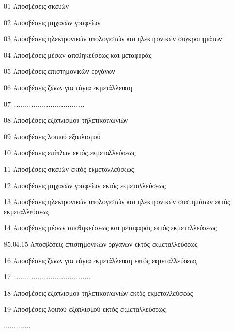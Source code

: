 \documentclass[A4,10pt,greek]{book}
\begin{document}
                               01    Αποσβέσεις σκευών

                               02    Αποσβέσεις μηχανών γραφείων

                               03    Αποσβέσεις ηλεκτρονικών υπολογιστών και ηλεκτρονικών
                                       συγκροτημάτων

                               04    Αποσβέσεις μέσων αποθηκεύσεως και μεταφοράς

                               05    Αποσβέσεις επιστημονικών οργάνων

                               06    Αποσβέσεις ζώων για πάγια εκμετάλλευση

                               07    ......................................

                               08    Αποσβέσεις εξοπλισμού τηλεπικοινωνιών

                               09    Αποσβέσεις λοιπού εξοπλισμού

                               10    Αποσβέσεις επίπλων εκτός εκμεταλλεύσεως

                               11    Αποσβέσεις σκευών εκτός εκμεταλλεύσεως

                               12    Αποσβέσεις μηχανών γραφείων εκτός εκμεταλλεύσεως

                               13    Αποσβέσεις ηλεκτρονικών υπολογιστών και ηλεκτρονικών
                                       συστημάτων εκτός εκμεταλλεύσεως

                               14    Αποσβέσεις μέσων αποθηκεύσεως και μεταφοράς εκτός
                                       εκμεταλλεύσεως

                    85.04.15    Αποσβέσεις επιστημονικών οργάνων εκτός εκμεταλλεύσεως

                               16    Αποσβέσεις ζώων για πάγια εκμετάλλευση εκτός
                                       εκμεταλλεύσεως

                               17    .........................................

                               18    Αποσβέσεις εξοπλισμού τηλεπικοινωνιών εκτός
                                       εκμεταλλεύσεως

                               19    Αποσβέσεις λοιπού εξοπλισμού εκτός εκμεταλλεύσεως

                    ..............
\end{document}
